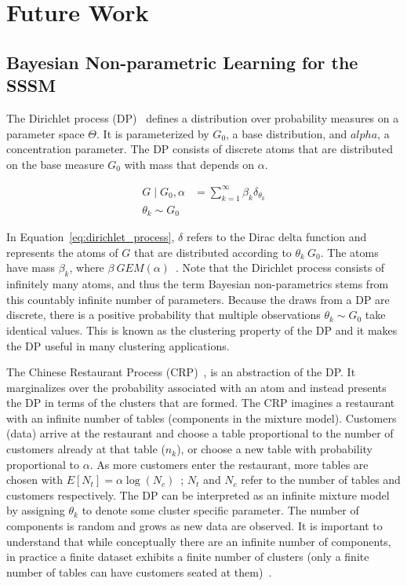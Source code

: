 \section{Future Work}
\subsection{Bayesian Non-parametric Learning for the SSSM}\label{sec:non-parameteric}
The Dirichlet process (DP)~\cite{ferguson1973bayesian} defines a distribution over probability measures on a parameter space $\Theta$. It is parameterized by $G_0$, a base distribution, and $alpha$, a concentration parameter. The DP consists of discrete atoms that are distributed on the base measure $G_0$ with mass that depends on $\alpha$.

\begin{equation}\label{eq:dirichlet_process}
  \begin{split}
    G \mid G_0, \alpha &= \sum\limits_{k=1}^{\infty} \beta_k \delta_{\theta_k} \\
    \theta_k \sim G_0
  \end{split}
\end{equation}

In Equation~\ref{eq:dirichlet_process}, $\delta$ refers to the Dirac delta function and represents the atoms of $G$ that are distributed according to $\theta_k ~ G_0$. The atoms have mass $\beta_k$, where $\beta ~ GEM(\alpha)$~\citep{neal2000markov}. Note that the Dirichlet process consists of infinitely many atoms, and thus the term Bayesian non-parametrics stems from this countably infinite number of parameters. Because the draws from a DP are discrete, there is a positive probability that multiple observations $\theta_k \sim G_0$ take identical values. This is known as the clustering property of the DP and it makes the DP useful in many clustering applications.

The Chinese Restaurant Process (CRP)~\citep{neal2000markov, gershman2012tutorial}, is an abstraction of the DP. It marginalizes over the probability associated with an atom and instead presents the DP in terms of the clusters that are formed. The CRP imagines a restaurant with an infinite number of tables (components in the mixture model). Customers (data) arrive at the restaurant and choose a table proportional to the number of customers already at that table ($n_k$), or choose a new table with probability proportional to $\alpha$. As more customers enter the restaurant, more tables are chosen with $E[N_t] = \alpha \log(N_c)$~\cite{gershman2012tutorial}; $N_t$ and $N_c$ refer to the number of tables and customers respectively. The DP can be interpreted as an infinite mixture model by assigning $\theta_k$ to denote some cluster specific parameter. The number of components is random and grows as new data are observed. It is important to understand that while conceptually there are an infinite number of components, in practice a finite dataset exhibits a finite number of clusters (only a finite number of tables can have customers seated at them)~\citep{blei2006variational}.

